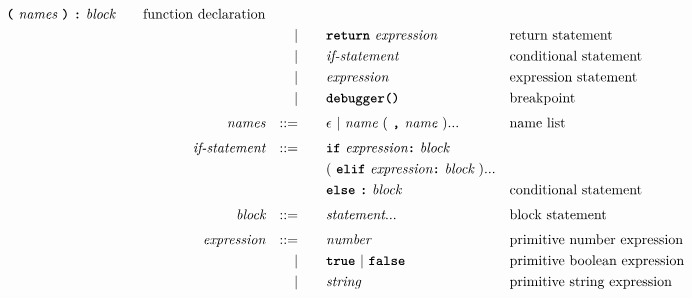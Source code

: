 \begin{alignat*}{9}
                                   \textbf{\texttt{(}}\  \textit{names} \ \textbf{\texttt{)}}\ \textbf{\texttt{:}}\ \textit{block} \quad
                                                           && \textrm{function declaration}\\
&&                       && |   &\quad && \textbf{\texttt{return}}\  \textit{expression}
                                                           && \textrm{return statement}\\
&&                       && |   &\quad && \textit{if-statement} \quad
                                                           && \textrm{conditional statement}\\
&&                       && |   &\quad &&  \textit{expression}
                                                           && \textrm{expression statement} \\
&&                       && |   &\quad &&  \textbf{\texttt{debugger()}}
                                                           && \textrm{breakpoint} \\[1mm]
&& \textit{names}   && ::= &\quad &&  \epsilon\ | \  \textit{name} \ 
                                                   (\ \textbf{\texttt{,}} \ \textit{name}\ ) ...
                                                            && \textrm{name list}   \\[1mm]
&& \textit{if-statement} && ::= &\quad && \textbf{\texttt{if}} \ \textit{expression} \textbf{\texttt{:}} \ \textit{block} \\
&&                       &&     &      && (\ \textbf{\texttt{elif}} \ \textit{expression} \textbf{\texttt{:}} \ \textit{block}\ )... \\
&&                       &&     &      && \textbf{\texttt{else}}\ \textbf{\texttt{:}} \ \textit{block} 
                                                            && \textrm{conditional statement}   \\[1mm]
&& \textit{block}        && ::= &      && \textit{statement}... \quad
                                                           && \textrm{block statement}\\[1mm]         
&& \textit{expression}   && ::= &\quad &&  \textit{number}   && \textrm{primitive number expression}\\
&&                       && |   &\quad && \textbf{\texttt{true}}\ |\ \textbf{\texttt{false}}
                                                           && \textrm{primitive boolean expression}\\
&&                       && |   &\quad &&  \textit{string}   && \textrm{primitive string expression}\\

\end{alignat*}
